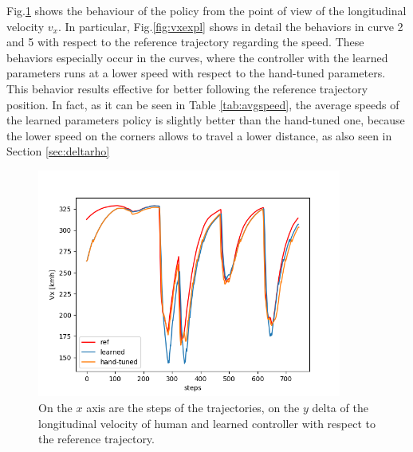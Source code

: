 Fig.\ref{fig:Vx} shows the behaviour of the policy from the point of view of the longitudinal velocity $v_x$.
In particular, Fig.\ref{fig:vxexpl} shows in detail the behaviors in curve 2 and 5 with respect to the reference trajectory regarding the speed. These behaviors especially occur in the curves, where the controller with the learned parameters runs at a lower speed with respect to the hand-tuned parameters. This behavior results effective for better following the reference trajectory position. In fact, as it can be seen in Table \ref{tab:avgspeed}, the average speeds of the learned parameters policy is slightly better than the hand-tuned one, because the lower speed on the corners allows to travel a lower distance, as also seen in Section \ref{sec:deltarho}

\begin{figure}[H]
 \centering
  \captionsetup{width=10cm}
  \includegraphics[width=10cm]{./img/velocities_pois/speed_x_comparison}
  \caption{On the $x$ axis are the steps of the trajectories, on the $y$ delta of the longitudinal velocity of human and learned controller with respect to the reference trajectory.}
   \label{fig:Vx}
\end{figure}

